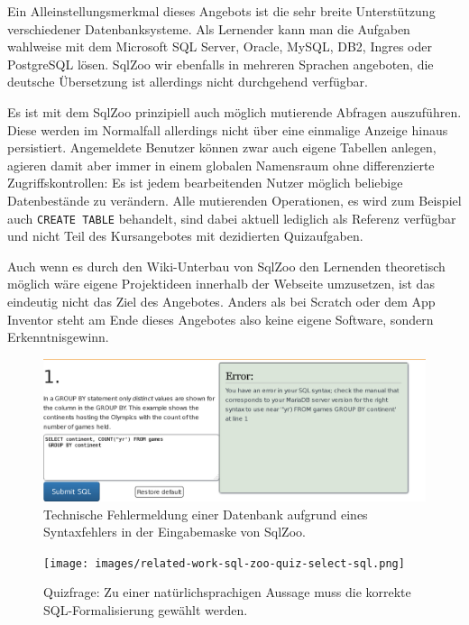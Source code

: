 Ein Alleinstellungsmerkmal dieses Angebots ist die sehr breite Unterstützung verschiedener Datenbanksysteme. Als Lernender kann man die Aufgaben wahlweise mit dem Microsoft SQL Server, Oracle, MySQL, DB2, Ingres oder PostgreSQL lösen. SqlZoo wir ebenfalls in mehreren Sprachen angeboten, die deutsche Übersetzung ist allerdings nicht durchgehend verfügbar.

Es ist mit dem SqlZoo prinzipiell auch möglich mutierende Abfragen auszuführen. Diese werden im Normalfall allerdings nicht über eine einmalige Anzeige hinaus persistiert. Angemeldete Benutzer können zwar auch eigene Tabellen anlegen, agieren damit aber immer in einem globalen Namensraum ohne differenzierte Zugriffskontrollen: Es ist jedem bearbeitenden Nutzer möglich beliebige Datenbestände zu verändern. Alle mutierenden Operationen, es wird zum Beispiel auch \lstinline{CREATE TABLE} behandelt, sind dabei aktuell lediglich als Referenz verfügbar und nicht Teil des Kursangebotes mit dezidierten Quizaufgaben.

Auch wenn es durch den Wiki-Unterbau von SqlZoo den Lernenden theoretisch möglich wäre eigene Projektideen innerhalb der Webseite umzusetzen, ist das eindeutig nicht das Ziel des Angebotes. Anders als bei Scratch oder dem App Inventor steht am Ende dieses Angebotes also keine eigene Software, sondern Erkenntnisgewinn.

\begin{figure}[p]
  \centering \includegraphics[width=\textwidth]{images/related-work-sql-zoo-error.png}
  \caption{Technische Fehlermeldung einer Datenbank aufgrund eines Syntaxfehlers in der Eingabemaske von SqlZoo.}
  \label{fig:sqlzoo-check-result}
\end{figure}

\begin{figure}[p]
  \centering \texttt{[image: images/related-work-sql-zoo-quiz-select-sql.png]}
  \caption{Quizfrage: Zu einer natürlichsprachigen Aussage muss die korrekte SQL-Formalisierung gewählt werden.}
  \label{fig:sqlzoo-quiz-sql-formalization}
\end{figure}

